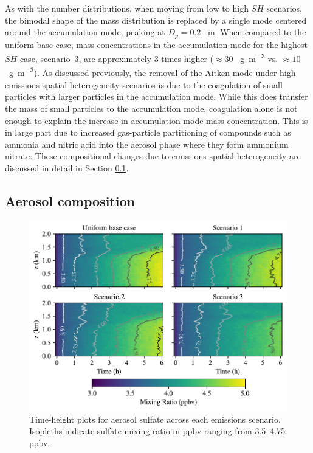 As with the number distributions, when moving from low to high $SH$ scenarios, the bimodal shape of the mass distribution is replaced by a single mode centered around the accumulation mode, peaking at $D_p = 0.2$ \si{\mu m}. When compared to the uniform base case, mass concentrations in the accumulation mode for the highest $SH$ case, scenario~3, are approximately 3 times higher ($\approx30$ \si{\mu g.m^{-3}} vs. $\approx10$ \si{\mu g.m^{-3}}). As discussed previously, the removal of the Aitken mode under high emissions spatial heterogeneity scenarios is due to the coagulation of small particles with larger particles in the accumulation mode. While this does transfer the mass of small particles to the accumulation mode, coagulation alone is not enough to explain the increase in accumulation mode mass concentration. This is in large part due to increased gas-particle partitioning of compounds such as ammonia and nitric acid into the aerosol phase where they form ammonium nitrate. These compositional changes due to emissions spatial heterogeneity are discussed in detail in Section \ref{aero-comp}.


\subsection{Aerosol composition}\label{aero-comp}

\begin{figure}[!t]
  \centering
    \includegraphics[width=\textwidth]{figures/chapter5/height-time-pmc_SO4-four-scenarios.pdf}
    \caption{Time-height plots for aerosol sulfate across each emissions scenario. Isopleths indicate sulfate mixing ratio in ppbv ranging from 3.5--4.75 ppbv.}
    \label{fig:ht-so4}
\end{figure}

